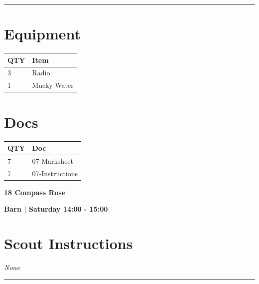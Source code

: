 \documentclass[10pt]{article}
\newcommand{\newtitle}[1]{\begin{center}{\Huge\bfseries #1 }\\ \vspace{5mm}\end{center}}
\newcommand{\newsubtitle}[1]{\begin{center}{\color{grey}\Large\bfseries #1 }\\ \vspace{5mm}\end{center}}
\begin{document}
			\vspace{0.5cm}
	\hrule
	\vspace{0.5cm}

	\begin{multicols}{2}

		\section*{\faWrench \: Equipment}

		
	\begin{center}
			\begin{tabular}{p{2cm}p{4cm}}


				\textbf{QTY} & \textbf{Item} \\\toprule
												3&Radio\\\midrule
												1&Mucky Water\\\midrule
								\end{tabular}

			\end{center}

		
		\vfill\null
		\columnbreak

			\section*{\faFile \: Docs}
		 	\begin{center}
			\begin{tabular}{p{2cm}p{4cm}}

			\textbf{QTY} & \textbf{Doc} \\\toprule
										7&07-Marksheet\\\midrule
										7&07-Instructions\\\midrule
							\end{tabular}
			\end{center}
	

		\vfill\null

		\end{multicols}



	\vspace{1cm}


	\clearpage
		\newtitle{18 Compass Rose }
	\newsubtitle{Barn | Saturday 14:00 - 15:00}
		\setcounter{section}{17}
	\section*{Scout Instructions}
		\textit{None}
	
	\vspace{0.5cm}
	\hrule
	\vspace{0.5cm}
\end{document}
